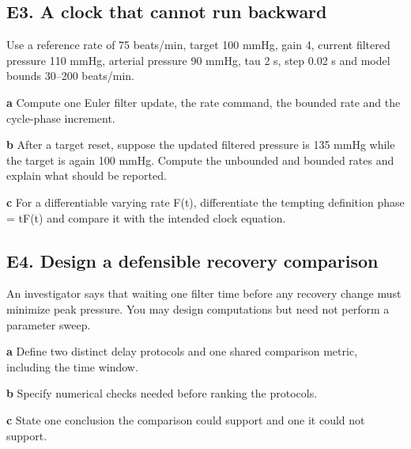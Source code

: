 \documentclass[11pt,letterpaper]{article}
\theoremstyle{definition}\newtheorem{definition}{Definition}\newtheorem{example}{Example}
\numberwithin{equation}{section}
\begin{document}
\par\noindent\begin{minipage}{\linewidth}
\subsection*{E3. A clock that cannot run backward}
Use a reference rate of 75 beats/min, target 100 mmHg, gain 4, current filtered pressure 110 mmHg, arterial pressure 90 mmHg, tau 2 s, step 0.02 s and model bounds 30--200 beats/min.

\textbf{a} Compute one Euler filter update, the rate command, the bounded rate and the cycle-phase increment.

\end{minipage}\par\medskip
\textbf{b} After a target reset, suppose the updated filtered pressure is 135 mmHg while the target is again 100 mmHg. Compute the unbounded and bounded rates and explain what should be reported.

\textbf{c} For a differentiable varying rate F(t), differentiate the tempting definition phase =\allowbreak{} tF(t) and compare it with the intended clock equation.

\par\noindent\begin{minipage}{\linewidth}
\subsection*{E4. Design a defensible recovery comparison}
An investigator says that waiting one filter time before any recovery change must minimize peak pressure. You may design computations but need not perform a parameter sweep.

\textbf{a} Define two distinct delay protocols and one shared comparison metric, including the time window.

\end{minipage}\par\medskip
\textbf{b} Specify numerical checks needed before ranking the protocols.

\textbf{c} State one conclusion the comparison could support and one it could not support.
\end{document}
